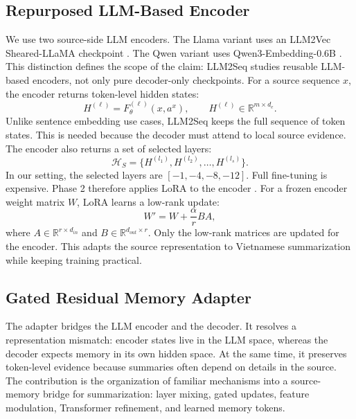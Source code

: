 \documentclass[11pt]{article}
\begin{document}
\subsection{Repurposed LLM-Based Encoder}

We use two source-side LLM encoders.
The Llama variant uses an LLM2Vec Sheared-LLaMA checkpoint \citep{behnamghader2024llm2vec}.
The Qwen variant uses Qwen3-Embedding-0.6B \citep{zhang2025qwen3embedding}.
This distinction defines the scope of the claim: LLM2Seq studies reusable LLM-based encoders, not only pure decoder-only checkpoints.
For a source sequence $x$, the encoder returns token-level hidden states:
\begin{equation}
H^{(\ell)}=F^{(\ell)}_{\theta}(x,a^x),
\qquad
H^{(\ell)}\in\mathbb{R}^{m\times d_e}.
\end{equation}
Unlike sentence embedding use cases, LLM2Seq keeps the full sequence of token states.
This is needed because the decoder must attend to local source evidence.
The encoder also returns a set of selected layers:
\begin{equation}
\mathcal{H}_S=\{H^{(l_1)},H^{(l_2)},\ldots,H^{(l_s)}\}.
\end{equation}
In our setting, the selected layers are $[-1,-4,-8,-12]$.
Full fine-tuning is expensive.
Phase 2 therefore applies LoRA to the encoder \citep{hu2022lora}.
For a frozen encoder weight matrix $W$, LoRA learns a low-rank update:
\begin{equation}
W'=W+\frac{\alpha}{r}BA,
\end{equation}
where $A\in\mathbb{R}^{r\times d_{in}}$ and
$B\in\mathbb{R}^{d_{out}\times r}$.
Only the low-rank matrices are updated for the encoder.
This adapts the source representation to Vietnamese summarization while keeping training practical.

\subsection{Gated Residual Memory Adapter}

The adapter bridges the LLM encoder and the decoder.
It resolves a representation mismatch: encoder states live in the LLM space, whereas the decoder expects memory in its own hidden space.
At the same time, it preserves token-level evidence because summaries often depend on details in the source.
The contribution is the organization of familiar mechanisms into a source-memory bridge for summarization: layer mixing, gated updates, feature modulation, Transformer refinement, and learned memory tokens.
\end{document}
